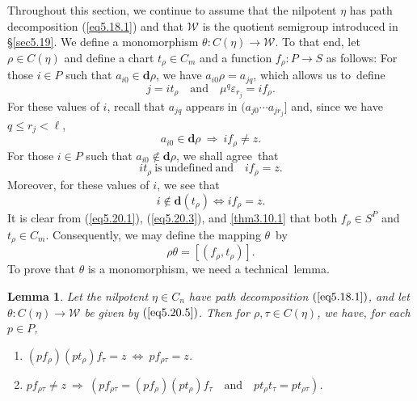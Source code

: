 \documentclass{surv-l}
\numberwithin{equation}{section}
\numberwithin{table}{section}
\numberwithin{figure}{section}
\theoremstyle{plain}
\newtheorem{lemma}[equation]{Lemma}
\theoremstyle{definition}
\begin{document}
Throughout this section, we continue to assume that the nilpotent
$\eta$ has path decomposition (\ref{eq5.18.1}) and that
$\mathcal{W}$ is the quotient semigroup introduced in
\S\ref{sec5.19}. We define a monomorphism $\theta :
C(\eta)\rightarrow \mathcal{W}$. To that end, let $\rho\in
C(\eta)$ and define a chart $t_{\rho}\in C_{m}$ and a function
$f_{\rho} : P\rightarrow S$ as follows: For those $i\in P$ such
that $ a_{i0}\in \mathbf{d}\rho$, we have $a_{i0}\rho=a_{jq}$,
which allows us to~define
\begin{equation}\label{eq5.20.1}
 j=it_{\rho}\quad \mathrm{and}\quad \mu^{q}\varepsilon_{r_{j}}=if_{\rho}.
\end{equation}
For these values of $i$, recall that $a_{jq}$ appears in
$(a_{j0}\cdots a_{jr_{j}}]$ and, since we have $q\leq r_{j}<\ell$,
\begin{equation}\label{eq5.20.2}
a_{i0}\in \mathbf{d}\rho\ \Rightarrow\ if_{\rho}\neq z.
\end{equation}
For those $i\in P$ such that $a_{i0}\not\in \mathbf{d}\rho$, we
shall agree~that
\begin{equation}\label{eq5.20.3}
it_{\rho}\ \mathrm{is\ undefined\ and}\quad if_{\rho}=z.
\end{equation}
Moreover, for these values of $i$, we see that
\begin{equation}\label{eq5.20.4}
 i\not\in \mathbf{d}(t_{\rho})\Leftrightarrow if_{\rho}=z.
\end{equation}
It is clear from (\ref{eq5.20.1}), (\ref{eq5.20.3}), and
\ref{thm3.10.1} that both $f_{\rho}\in S^{P}$ and $t_{\rho}\in
C_{m}$. Consequently, we may define the mapping $\theta$~by
\begin{equation}\label{eq5.20.5}
\rho\theta=[(f_{\rho}, t_{\rho})].
\end{equation}
To prove that $\theta$ is a monomorphism, we need a
technical~lemma.

\begin{lemma}\label{lem5.20.6}
Let the nilpotent $\eta\in C_{n}$ have path decomposition
$(\ref{eq5.18.1})$, and let $\theta : C(\eta)\rightarrow
\mathcal{W}$ be given by $(\ref{eq5.20.5})$. Then for $\rho,
\tau\in C(\eta)$, we have, for each $p\in P$,
\begin{enumerate}
\item[($i$)] $(pf_{\rho})(pt_{\rho})f_{\tau}=z\ \Leftrightarrow\
pf_{\rho\tau}=z$.

\item[($ii$)] $pf_{\rho\tau}\neq z\ \Rightarrow\
(pf_{\rho\tau}=(pf_{\rho})(pt_{\rho})f_{\tau}\quad \text{and}\quad
pt_{\rho}t_{\tau}=pt_{\rho\tau})$.
\end{enumerate}
\end{lemma}
\end{document}
